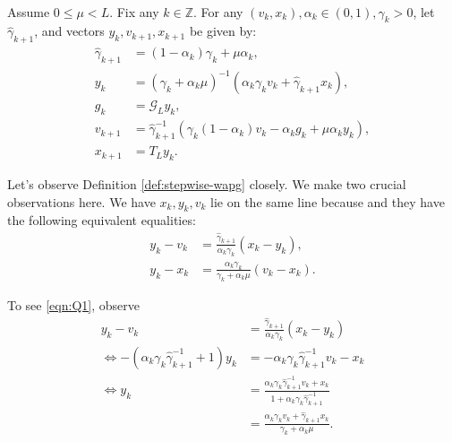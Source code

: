 \documentclass[12pt]{article}
\begin{document}
    \begin{definition}\label{def:stepwise-wapg}\;\\
        Assume $0 \le \mu < L$.
        Fix any $k \in \mathbb Z$. 
        For any $(v_k, x_k), \alpha_k \in (0, 1), \gamma_k > 0$, let $\hat \gamma_{k + 1}$, and vectors $y_k, v_{k + 1}, x_{k + 1}$ be given by: 
        \begin{align}
            \hat \gamma_{k + 1} &= (1 - \alpha_k)\gamma_k + \mu \alpha_k, \label{eqn:stepwise-wapg-eqn1}
            \\
            y_k &= 
            (\gamma_k + \alpha_k \mu)^{-1}(\alpha_k \gamma_k v_k + \hat\gamma_{k + 1} x_k), \label{eqn:stepwise-wapg-eqn2}
            \\
            g_k &= \mathcal G_L y_k, \label{eqn:stepwise-wapg-eqn3}
            \\
            v_{k + 1} &= \hat\gamma^{-1}_{k + 1}
            (\gamma_k(1 - \alpha_k) v_k - \alpha_k g_k + \mu \alpha_k y_k), \label{eqn:stepwise-wapg-eqn4}
            \\
            x_{k + 1} &= T_L y_k. \label{eqn:stepwise-wapg-eqn5}
        \end{align}
    \end{definition}
    \begin{observation}\label{obs:stepwise-wapg}
        Let's observe Definition \ref{def:stepwise-wapg} closely. 
        We make two crucial observations here. 
        We have $x_k, y_k, v_k$ lie on the same line because and they have the following equivalent equalities: 
        \begin{align*}
            y_k - v_k &= 
            \frac{\hat \gamma_{k + 1}}{\alpha_k \gamma_k}(x_k - y_k), 
            \tag{Q1}\label{eqn:Q1}
            \\
            y_k - x_k &= 
            \frac{\alpha_k \gamma_k}{\gamma_k + \alpha_k \mu}(v_k - x_k). 
            \tag{Q2}\label{eqn:Q2}
        \end{align*}
    \end{observation}
        To see \eqref{eqn:Q1}, observe 
        \begin{align*}
            y_k - v_k &= 
            \frac{\hat \gamma_{k + 1}}{\alpha_k \gamma_k}(x_k - y_k)
            \\
            \iff 
            -(\alpha_k \gamma_k \hat \gamma^{-1}_{k + 1} + 1)y_k
            &= 
            - \alpha_k \gamma_k \hat \gamma^{-1}_{k + 1}v_k - x_k
            \\
            \iff 
            y_k &= 
            \frac{
                \alpha_k \gamma_k \hat \gamma_{k + 1}^{-1}v_k + x_k
            }{1 + \alpha_k \gamma_k \hat \gamma_{k + 1}^{-1}}
            \\
            &=  
            \frac{\alpha_k \gamma_k v_k + \hat \gamma_{k + 1} x_k}{\gamma_k + \alpha_k \mu}.
        \end{align*}
\end{document}
